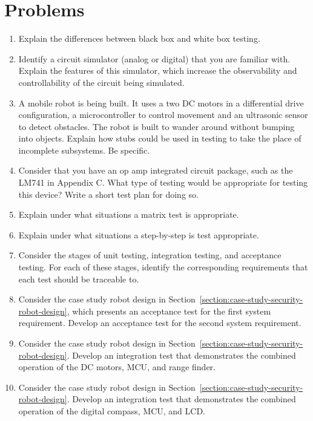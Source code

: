 \section{Problems}
\label{section:problems}

\begin{enumerate}
\def\labelenumi{\arabic{enumi}.}
\item
  Explain the differences between black box and white box testing.
\item
  Identify a circuit simulator (analog or digital) that you are familiar
  with. Explain the features of this simulator, which increase the
  observability and controllability of the circuit being simulated.
\item
  A mobile robot is being built. It uses a two DC motors in a
  differential drive configuration, a microcontroller to control
  movement and an ultrasonic sensor to detect obstacles. The robot is
  built to wander around without bumping into objects. Explain how stubs
  could be used in testing to take the place of incomplete subsystems.
  Be specific.
\item
  Consider that you have an op amp integrated circuit package, such as
  the LM741 in Appendix C. What type of testing would be appropriate for
  testing this device? Write a short test plan for doing so.
\item
  Explain under what situations a matrix test is appropriate.
\item
  Explain under what situations a step-by-step is test appropriate.
\item
  Consider the stages of unit testing, integration testing, and
  acceptance testing. For each of these stages, identify the
  corresponding requirements that each test should be traceable to.
\item
  Consider the case study robot design in Section~\ref{section:case-study-security-robot-design}, 
  which presents an
  acceptance test for the first system requirement. Develop an
  acceptance test for the second system requirement.
\item
  Consider the case study robot design in Section~\ref{section:case-study-security-robot-design}. 
  Develop an
  integration test that demonstrates the combined operation of the DC
  motors, MCU, and range finder.
\item
  Consider the case study robot design in Section~\ref{section:case-study-security-robot-design}. 
  Develop an
  integration test that demonstrates the combined operation of the
  digital compass, MCU, and LCD.

\end{enumerate}
